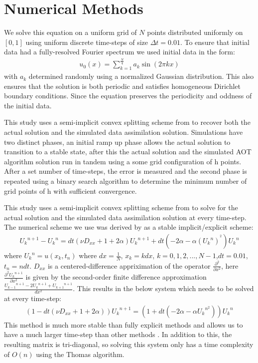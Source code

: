 \documentclass[12pt]{amsart}
\theoremstyle{plain}
\theoremstyle{definition}
\theoremstyle{remark}
\numberwithin{equation}{section} %
\numberwithin{figure}{section}   %
\begin{document}
 \section{Numerical Methods}\label{secNum}
We solve this equation on a uniform grid of $N$ points distributed uniformly on $\left[0,1\right]$ using uniform discrete time-steps of size $\Delta t = 0.01$. To ensure that initial data had a fully-resolved Fourier spectrum we used initial data in the form:
\begin{align*}
u_0(x) = \sum_{k=1}^{\frac{N}{4}}a_k\sin(2\pi kx)
\end{align*}
with $a_k$ determined randomly using a normalized Gaussian distribution. This also ensures that the solution is both periodic and satisfies homogeneous Dirichlet boundary conditions. Since the equation preserves the periodicity and oddness of the initial data.

This study uses a semi-implicit convex splitting scheme from \cite{Eyre_1997,Eyre_1998} to recover both the actual solution and the simulated data assimilation solution. Simulations have two distinct phases, an initial ramp up phase allows the actual solution to transition to a stable state, after this the actual solution and the simulated AOT algorithm solution run in tandem using a some grid configuration of h points. After a set number of time-steps, the error is measured and the second phase is repeated using a binary search algorithm to determine the minimum number of grid points of h with sufficient convergence.  


 This study uses a semi-implicit convex splitting scheme from \cite{Eyre_1997,Eyre_1998} to solve for the actual solution and the simulated data assimilation solution at every time-step. The numerical scheme we use was derived by \cite{Eyre_1997,Eyre_1998} as a stable implicit/explicit scheme:
 \begin{align*}
 {U_k}^{n+1} - {U_k}^n = dt(\nu D_{xx} + 1+2\alpha){U_k}^{n+1} + dt(-2\alpha - \alpha ({U_k}^{n})^{^2}){{U_k}^n}
 \end{align*} 
 where ${U_k}^{n} = u(x_k,t_n)$ where $dx = \frac{1}{N}$, $x_k = k dx$, $k = 0,1,2,...,N-1$,$dt = 0.01$, $t_n = n dt$. 
 $D_{xx}$ is a centered-difference appriximation of the operator $\frac{\partial^2}{\partial x^2} $, here $\frac{\partial^2 {U_k}^{n+1}}{\partial x^2}$ is given by the second-order finite difference approximation $\frac{{U_{k-1}}^{n+1} - 2{U_{k}}^{n+1} + {U_{k+1}}^{n+1}}{dx^2} $. This results in the below system which needs to be solved at every time-step:
 \begin{align*}
 (1 - dt(\nu D_{xx} + 1+2\alpha)){U_k}^{n+1} =  (1+dt(-2\alpha - \alpha {U_k}^{n^2})){{U_k}^n}
 \end{align*}
 This method is much more stable than fully explicit methods and allows us to have a much larger time-step than other methods \cite{Eyre_1997}. In addition to this, the resulting matrix is tri-diagonal, so solving this system only has a time complexity of $O(n)$ using the Thomas algorithm.
 
\end{document}
